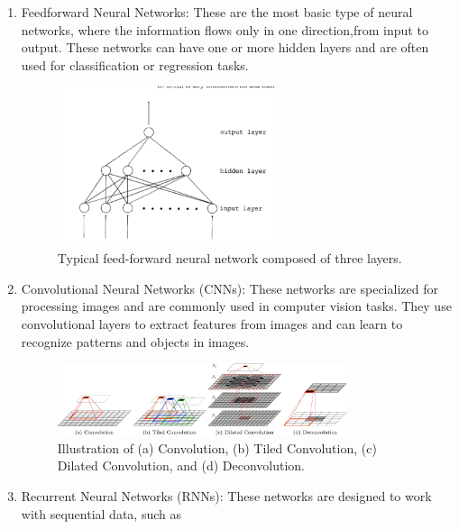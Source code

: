 \begin{enumerate}
    \item Feedforward Neural Networks: These are the most basic type of neural networks, where the information flows
    only in one direction,from input to output. These networks can have one or more hidden layers and are often used
    for classification or regression tasks.
    \newpage
    \begin{center}
        \begin{figure}[!ht]
            \centering
            \includegraphics[width=0.6\textwidth]{figures/ff}
            \caption{Typical feed-forward neural network composed of three layers. \cite{svozil1997quantum}}
            \label{fig:ff}
        \end{figure}
    \end{center}
    \item Convolutional Neural Networks (CNNs): These networks are specialized for processing images and are commonly
    used in computer vision tasks. They use convolutional layers to extract features from images and can learn to
    recognize patterns and objects in images.
    \begin{center}
        \begin{figure}[!ht]
            \centering
            \includegraphics[width=0.8\textwidth]{figures/cn}
            \caption{Illustration of (a) Convolution, (b) Tiled Convolution, (c) Dilated Convolution, and (d)
                Deconvolution. \cite{GU2018354}}
            \label{fig:cn}
        \end{figure}
    \end{center}
    \item Recurrent Neural Networks (RNNs): These networks are designed to work with sequential data, such as

\end{enumerate}
